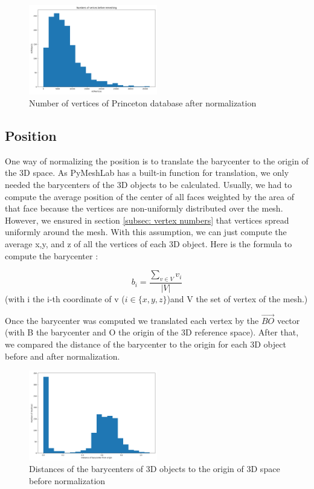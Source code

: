 \documentclass[10pt,twocolumn,letterpaper]{article}
\begin{document}
\begin{figure}[h!]
\begin{center}
  \includegraphics[width=0.5\textwidth]{picture/Princeton_afterRemesh}
  \caption{Number of vertices of Princeton database after normalization}
  \label{fig:princeton-vertices}
  \end{center}
\end{figure}

\subsection{Position}

One way of normalizing the position is to translate the barycenter to the origin of the 3D space. As PyMeshLab has a built-in function for translation, we only needed the barycenters of the 3D objects to be calculated. Usually, we had to compute the average position of the center of all faces weighted by the area of that face because the vertices are non-uniformly distributed over the mesh. However, we ensured in section \ref{subsec: vertex numbers} that vertices spread uniformly around the mesh. With this assumption, we can just compute the average x,y, and z of all the vertices of each 3D object. Here is the formula to compute the barycenter :

$$ b_i = \frac{\sum_{v \in V} v_i}{|V|} $$ (with i the i-th coordinate of v ($i \in \{x,y,z\}$)and V the set of vertex of the mesh.)

Once the barycenter was computed we translated each vertex by the $\overrightarrow{BO}$ vector (with B the barycenter and O the origin of the 3D reference space). After that, we compared the distance of the barycenter to the origin for each 3D object before and after normalization.
	
\begin{figure}[h!]
\begin{center}
  \includegraphics[width=0.5\textwidth]{picture/Initial barycenter}
  \caption{Distances of the barycenters of 3D objects to the origin of 3D space before normalization}
  \label{fig:barycenter-before}
  \end{center}
\end{figure}
\end{document}
